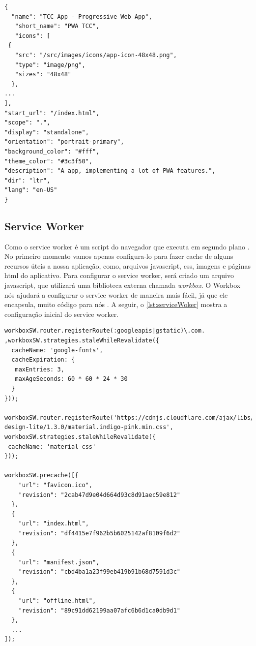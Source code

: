 \newpage

\begin{lstlisting}[frame=single,label=lst:arquivoManifest,caption=Arquivo Manifesto, basicstyle=\footnotesize]
{
  "name": "TCC App - Progressive Web App",
   "short_name": "PWA TCC",
   "icons": [
 {
   "src": "/src/images/icons/app-icon-48x48.png",
   "type": "image/png",
   "sizes": "48x48"
  },
...
],
"start_url": "/index.html",
"scope": ".",
"display": "standalone",
"orientation": "portrait-primary",
"background_color": "#fff",
"theme_color": "#3c3f50",
"description": "A app, implementing a lot of PWA features.",
"dir": "ltr",
"lang": "en-US"
}
\end{lstlisting}
 \vspace{-0.75cm}
\begin{center}
\end{center}

\subsection*{Service Worker}
Como o service worker é um script do navegador que executa em segundo plano \cite{servicework}. No primeiro momento vamos apenas configura-lo para fazer cache de alguns recursos úteis a nossa aplicação, como, arquivos javascript, css, imagens e páginas html do aplicativo. Para configurar o service worker, será criado um arquivo javascript, que utilizará uma biblioteca externa chamada \textit{workbox}. O Workbox nós ajudará a configurar o service worker de maneira mais fácil, já que ele encapsula, muito código para nós \cite{workbox}. A seguir, o \autoref{lst:serviceWoker} mostra a configuração inicial do  service worker.

\newpage

\begin{lstlisting}[frame=single,label=lst:serviceWoker,caption=Service Worker, basicstyle=\footnotesize]
workboxSW.router.registerRoute(:googleapis|gstatic)\.com.
,workboxSW.strategies.staleWhileRevalidate({
  cacheName: 'google-fonts',
  cacheExpiration: {
   maxEntries: 3,
   maxAgeSeconds: 60 * 60 * 24 * 30
  }
}));

workboxSW.router.registerRoute('https://cdnjs.cloudflare.com/ajax/libs/material-design-lite/1.3.0/material.indigo-pink.min.css', workboxSW.strategies.staleWhileRevalidate({
 cacheName: 'material-css'
}));

workboxSW.precache([{
    "url": "favicon.ico",
    "revision": "2cab47d9e04d664d93c8d91aec59e812"
  },
  {
    "url": "index.html",
    "revision": "df4415e7f962b5b6025142af8109f6d2"
  },
  {
    "url": "manifest.json",
    "revision": "cbd4ba1a23f99eb419b91b68d7591d3c"
  },
  {
    "url": "offline.html",
    "revision": "89c91dd62199aa07afc6b6d1ca0db9d1"
  },
  ...
]);

\end{lstlisting}

